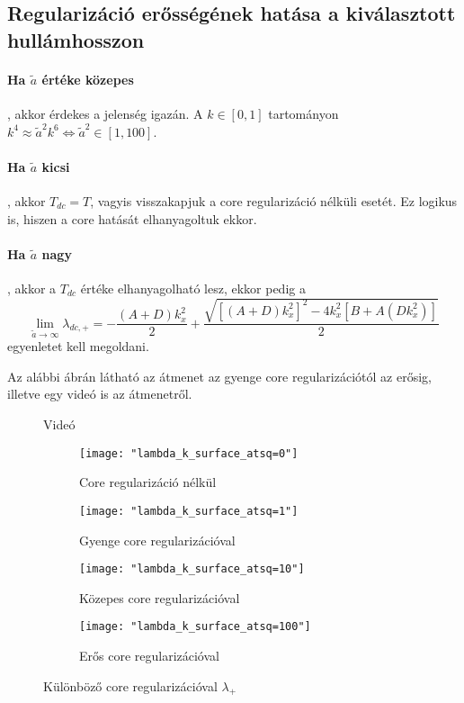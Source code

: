 \documentclass[10pt,a4paper]{scrartcl}
\begin{document}
\subsection{Regularizáció erősségének hatása a kiválasztott hullámhosszon}
\paragraph{Ha $\tilde a$ értéke közepes}, akkor érdekes a jelenség igazán. A $k \in \left[ {0,1} \right]$ tartományon ${k^4} \approx {\tilde a^2}{k^6} \Leftrightarrow {\tilde a^2} \in \left[ {1,100} \right]$.

\paragraph{Ha $\tilde a$ kicsi}, akkor ${T_{dc}} = T$, vagyis visszakapjuk a core regularizáció nélküli esetét. Ez logikus is, hiszen a core hatását elhanyagoltuk ekkor. 

\paragraph{Ha $\tilde a$ nagy}, akkor a ${T_{dc}}$ értéke elhanyagolható lesz, ekkor pedig a
\[\mathop {\lim }\limits_{\tilde a \to \infty } {\lambda _{dc, + }} =  - \frac{{\left( {A + D} \right)k_x^2}}{2} + \frac{{\sqrt {{{\left[ {\left( {A + D} \right)k_x^2} \right]}^2} - 4k_x^2\left[ {B + A\left( {Dk_x^2} \right)} \right]} }}{2}\]
egyenletet kell megoldani.

Az alábbi ábrán látható az átmenet az gyenge core regularizációtól az erősig, illetve egy videó is az átmenetről.
\begin{figure}
\centering
{}
\caption{Videó}
\end{figure}

\begin{figure}[h]
\centering
\begin{subfigure}[t]{0.495\linewidth}
\centering\texttt{[image: "lambda\_k\_surface\_atsq=0"]}
\caption{Core regularizáció nélkül}
\end{subfigure}
\begin{subfigure}[t]{0.495\linewidth}
\centering\texttt{[image: "lambda\_k\_surface\_atsq=1"]}
\caption{Gyenge core regularizációval}
\end{subfigure}
\begin{subfigure}[t]{0.495\linewidth}
\centering\texttt{[image: "lambda\_k\_surface\_atsq=10"]}
\caption{Közepes core regularizációval}
\end{subfigure}
\begin{subfigure}[t]{0.495\linewidth}
\centering\texttt{[image: "lambda\_k\_surface\_atsq=100"]}
\caption{Erős core regularizációval}
\end{subfigure}
\caption{Különböző core regularizációval $\lambda_+$}
\end{figure}
\end{document}
